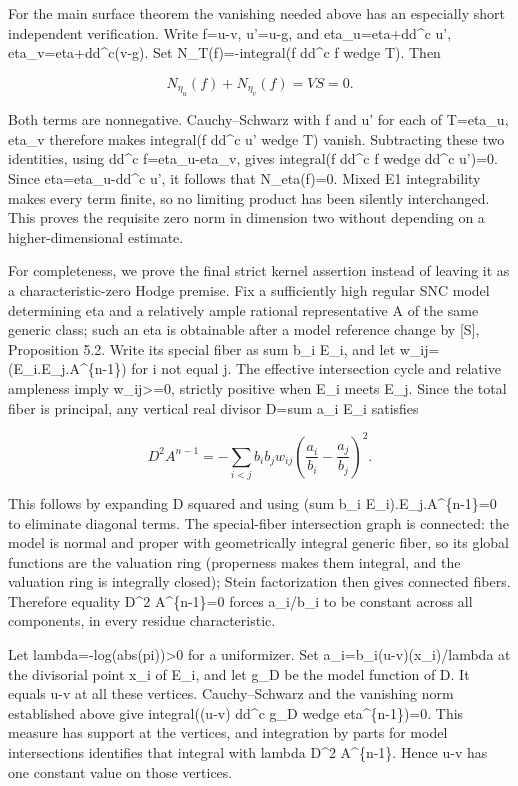 \documentclass[11pt]{article}
\begin{document}
For the main surface theorem the vanishing needed above has an especially short independent verification. Write f=u-v, u'=u-g, and eta\_u=eta+dd\textasciicircum{}c u', eta\_v=eta+dd\textasciicircum{}c(v-g). Set N\_T(f)=-integral(f dd\textasciicircum{}c f wedge T). Then

\[
N_{\eta_u}(f)+N_{\eta_v}(f)=VS=0.
\]

Both terms are nonnegative. Cauchy--Schwarz with f and u' for each of T=eta\_u, eta\_v therefore makes integral(f dd\textasciicircum{}c u' wedge T) vanish. Subtracting these two identities, using dd\textasciicircum{}c f=eta\_u-eta\_v, gives integral(f dd\textasciicircum{}c f wedge dd\textasciicircum{}c u')=0. Since eta=eta\_u-dd\textasciicircum{}c u', it follows that N\_eta(f)=0. Mixed E1 integrability makes every term finite, so no limiting product has been silently interchanged. This proves the requisite zero norm in dimension two without depending on a higher-dimensional estimate.

For completeness, we prove the final strict kernel assertion instead of leaving it as a characteristic-zero Hodge premise. Fix a sufficiently high regular SNC model determining eta and a relatively ample rational representative A of the same generic class; such an eta is obtainable after a model reference change by [S], Proposition 5.2. Write its special fiber as sum b\_i E\_i, and let w\_ij=(E\_i.E\_j.A\textasciicircum{}\{n-1\}) for i not equal j. The effective intersection cycle and relative ampleness imply w\_ij\textgreater{}=0, strictly positive when E\_i meets E\_j. Since the total fiber is principal, any vertical real divisor D=sum a\_i E\_i satisfies

\[
D^2 A^{n-1}=-\sum_{i<j}b_i b_j w_{ij}
\left(\frac{a_i}{b_i}-\frac{a_j}{b_j}\right)^2.
\]

This follows by expanding D squared and using (sum b\_i E\_i).E\_j.A\textasciicircum{}\{n-1\}=0 to eliminate diagonal terms. The special-fiber intersection graph is connected: the model is normal and proper with geometrically integral generic fiber, so its global functions are the valuation ring (properness makes them integral, and the valuation ring is integrally closed); Stein factorization then gives connected fibers. Therefore equality D\textasciicircum{}2 A\textasciicircum{}\{n-1\}=0 forces a\_i/b\_i to be constant across all components, in every residue characteristic.

Let lambda=-log(abs(pi))\textgreater{}0 for a uniformizer. Set a\_i=b\_i(u-v)(x\_i)/lambda at the divisorial point x\_i of E\_i, and let g\_D be the model function of D. It equals u-v at all these vertices. Cauchy--Schwarz and the vanishing norm established above give integral((u-v) dd\textasciicircum{}c g\_D wedge eta\textasciicircum{}\{n-1\})=0. This measure has support at the vertices, and integration by parts for model intersections identifies that integral with lambda D\textasciicircum{}2 A\textasciicircum{}\{n-1\}. Hence u-v has one constant value on those vertices.
\end{document}
